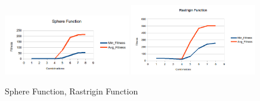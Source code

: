 \documentclass[b5paper,11pt, abstraction, titlepage]{scrartcl}
\begin{document}
\begin{CJK}{UTF8}{gbsn}
\begin{figure}
  \centering
  \includegraphics[width=0.49\textwidth]{sphb}
  \includegraphics[width=0.49\textwidth]{rasb}
  \caption{Sphere Function, Rastrigin Function}
\end{figure}



\end{CJK}
\end{document}

